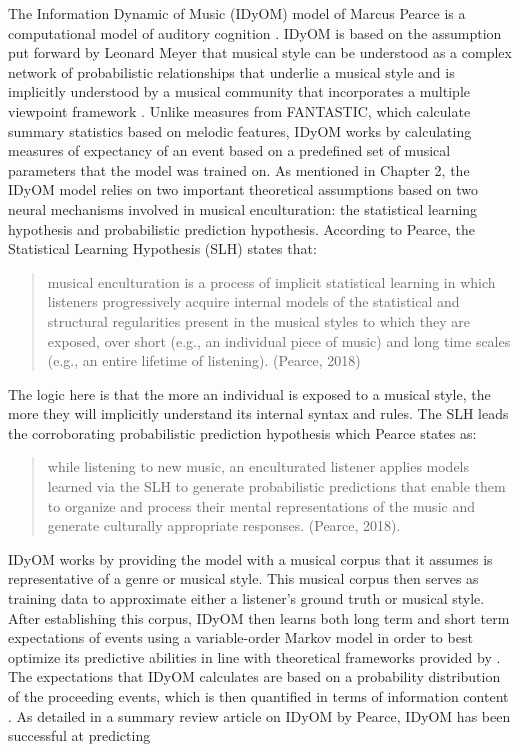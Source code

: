 \documentclass[12pt,]{book}
\begin{document}
The Information Dynamic of Music (IDyOM) model of Marcus Pearce is a computational model of auditory cognition \citep{pearceStatisticalLearningProbabilistic2018a}.
IDyOM is based on the assumption put forward by Leonard Meyer that musical style can be understood as a complex network of probabilistic relationships that underlie a musical style and is implicitly understood by a musical community \citep{pearceAuditoryExpectationInformation2012, pearceConstructionEvaluationStatistical2005, pearceStatisticalLearningProbabilistic2018a} that incorporates a multiple viewpoint framework \citep{conklinMultipleViewpointSystems1995}.
Unlike measures from FANTASTIC, which calculate summary statistics based on melodic features, IDyOM works by calculating measures of expectancy of an event based on a predefined set of musical parameters that the model was trained on.
As mentioned in Chapter 2, the IDyOM model relies on two important theoretical assumptions based on two neural mechanisms involved in musical enculturation: the statistical learning hypothesis and probabilistic prediction hypothesis.
According to Pearce, the Statistical Learning Hypothesis (SLH) states that:

\begin{quote}
musical enculturation is a process of implicit statistical learning in which listeners progressively acquire internal models of the statistical and structural regularities present in the musical styles to which they are exposed, over short (e.g., an individual piece of music) and long time scales (e.g., an entire lifetime of listening). (Pearce, 2018)
\end{quote}

The logic here is that the more an individual is exposed to a musical style, the more they will implicitly understand its internal syntax and rules.
The SLH leads the corroborating probabilistic prediction hypothesis which Pearce states as:

\begin{quote}
while listening to new music, an enculturated listener applies models learned via the SLH to generate probabilistic predictions that enable them to organize and process their mental representations of the music and generate culturally appropriate responses. (Pearce, 2018).
\end{quote}

IDyOM works by providing the model with a musical corpus that it assumes is representative of a genre or musical style.
This musical corpus then serves as training data to approximate either a listener's ground truth or musical style.
After establishing this corpus, IDyOM then learns both long term and short term expectations of events using a variable-order Markov model in order to best optimize its predictive abilities in line with theoretical frameworks provided by \citet{conklinMultipleViewpointSystems1995}.
The expectations that IDyOM calculates are based on a probability distribution of the proceeding events, which is then quantified in terms of information content \citep{shannonMathematicalTheoryCommunication1948}.
As detailed in a summary review article on IDyOM by Pearce, IDyOM has been successful at predicting
\end{document}
